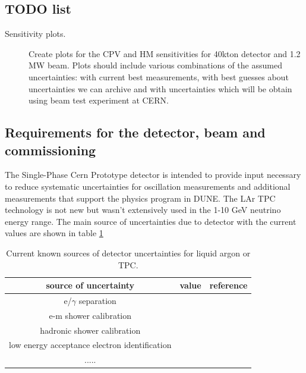
\subsection*{TODO list}
{\color{red}
\begin{description}
\item[Sensitivity plots.] 	
 Create plots for the CPV and HM sensitivities for 40kton detector and 1.2 MW beam. Plots should include various combinations of the assumed uncertainties: with current best measurements,  with best guesses about uncertainties we can archive and with  uncertainties which will be obtain using beam test experiment at CERN.
\end{description}

}

\subsection{Requirements for the detector, beam and commissioning}
\label{detbeam_main}
The Single-Phase Cern Prototype detector is intended to provide input necessary to reduce systematic uncertainties for oscillation measurements 
and additional measurements that support the physics program in DUNE. 
The LAr TPC technology is not new but wasn't extensively used in the 1-10 GeV neutrino energy range.  
The main source of uncertainties due to detector with the current values are shown in table \ref{table:deterr}


\begin{table}[h]
\centering
\caption{Current known sources of detector uncertainties for liquid argon or TPC.}
\label{table:deterr}
\begin{tabular}{|c|c|c|}
\hline
\textbf{source of uncertainty } & \textbf{value} & \textbf{reference}  \\ \hline
  e/$\gamma$ separation        &           &                   \\ \hline
  e-m shower calibration        &           &            \\ \hline
   hadronic shower calibration       &           &        \\ \hline
low energy acceptance electron identification &   &  \\ \hline
 .....   &   &   \\ \hline
\end{tabular}
\end{table}



